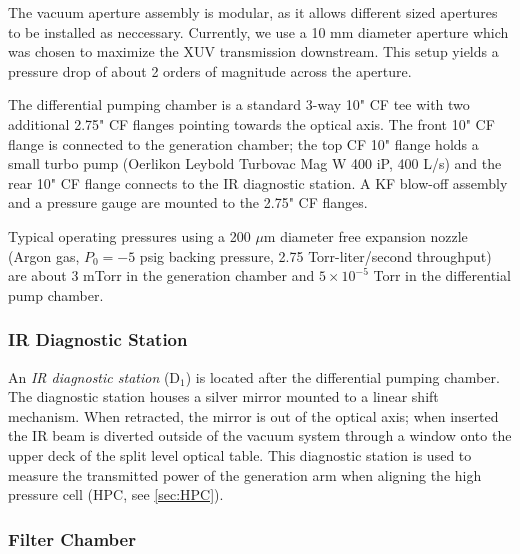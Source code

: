The vacuum aperture assembly is modular, as it allows different sized apertures to be installed as neccessary. Currently, we use a 10 mm diameter aperture which was chosen to maximize the XUV transmission downstream. This setup yields a pressure drop of about 2 orders of magnitude across the aperture.

The differential pumping chamber is a standard 3-way 10" CF tee with two additional 2.75" CF flanges pointing towards the optical axis. The front 10" CF flange is connected to the generation chamber; the top CF 10" flange holds a small turbo pump (Oerlikon Leybold Turbovac Mag W 400 iP, 400 L/s) and the rear 10" CF flange connects to the IR diagnostic station. A KF blow-off assembly and a pressure gauge are mounted to the 2.75" CF flanges.

Typical operating pressures using a 200 $\mu$m diameter free expansion nozzle (Argon gas, $P_0 = -5$ psig backing pressure, 2.75 Torr-liter/second throughput) are about 3 mTorr in the generation chamber and $5 \times 10^{-5}$ Torr in the differential pump chamber.

\subsubsection{IR Diagnostic Station}

An \textit{IR diagnostic station} (D$_1$) is located after the differential pumping chamber. The diagnostic station houses a silver mirror mounted to a linear shift mechanism. When retracted, the mirror is out of the optical axis; when inserted the IR beam is diverted outside of the vacuum system through a window onto the upper deck of the split level optical table. This diagnostic station is used to measure the transmitted power of the generation arm when aligning the high pressure cell (HPC, see \cref{sec:HPC}).

\subsubsection{Filter Chamber}

